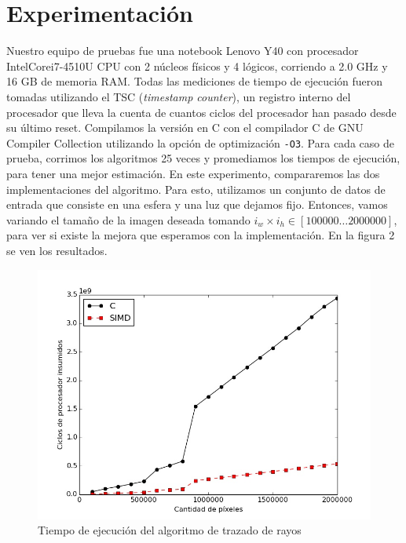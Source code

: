 \section{Experimentación}

Nuestro equipo de pruebas fue una notebook Lenovo Y40 con procesador Intel\textregistered Core\texttrademark i7-4510U CPU con 2 núcleos físicos y 4 lógicos, corriendo a 2.0 GHz y 16 GB de memoria RAM. Todas las mediciones de tiempo de ejecución fueron tomadas utilizando el TSC (\emph{timestamp counter}), un registro interno del procesador que lleva la cuenta de cuantos ciclos del procesador han pasado desde su último reset. Compilamos la versión en C con el compilador C de GNU Compiler Collection utilizando la opción de optimización \texttt{-O3}. Para cada caso de prueba, corrimos los algoritmos 25 veces y promediamos los tiempos de ejecución, para tener una mejor estimación. En este experimento, compararemos las dos implementaciones del algoritmo. Para esto, utilizamos un conjunto de datos de entrada que consiste en una esfera y una luz que dejamos fijo. Entonces, vamos variando el tamaño de la imagen deseada tomando $i_w \times i_h \in [100000 \dots 2000000]$, para ver si existe la mejora que esperamos con la implementación. En la figura 2 se ven los resultados.\\

\begin{figure}[H]
	\begin{center}
		\includegraphics[scale=0.5]{graph1.jpg}
	\end{center}		
	\caption{Tiempo de ejecución del algoritmo de trazado de rayos}
	\label{fig2}
\end{figure}

